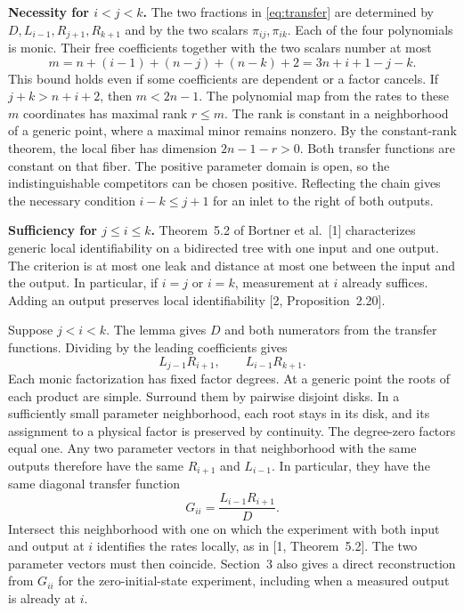 \documentclass[11pt,a4paper]{article}
\begin{document}
\noindent\textbf{Necessity for \(i<j<k\).}
The two fractions in \eqref{eq:transfer} are determined by \(D,L_{i-1},R_{j+1},R_{k+1}\) and by the two scalars \(\pi_{ij},\pi_{ik}\). Each of the four polynomials is monic. Their free coefficients together with the two scalars number at most
\begin{equation}
 m=n+(i-1)+(n-j)+(n-k)+2=3n+i+1-j-k. \label{eq:count}
\end{equation}
This bound holds even if some coefficients are dependent or a factor cancels. If \(j+k>n+i+2\), then \(m<2n-1\). The polynomial map from the rates to these \(m\) coordinates has maximal rank \(r\le m\). The rank is constant in a neighborhood of a generic point, where a maximal minor remains nonzero. By the constant-rank theorem, the local fiber has dimension \(2n-1-r>0\). Both transfer functions are constant on that fiber. The positive parameter domain is open, so the indistinguishable competitors can be chosen positive. Reflecting the chain gives the necessary condition \(i-k\le j+1\) for an inlet to the right of both outputs.

\noindent\textbf{Sufficiency for \(j\le i\le k\).}
Theorem~5.2 of Bortner et al.~[1] characterizes generic local identifiability on a bidirected tree with one input and one output. The criterion is at most one leak and distance at most one between the input and the output. In particular, if \(i=j\) or \(i=k\), measurement at \(i\) already suffices. Adding an output preserves local identifiability [2, Proposition~2.20].

Suppose \(j<i<k\). The lemma gives \(D\) and both numerators from the transfer functions. Dividing by the leading coefficients gives
\[
             L_{j-1}R_{i+1},\qquad L_{i-1}R_{k+1}.
\]
Each monic factorization has fixed factor degrees. At a generic point the roots of each product are simple. Surround them by pairwise disjoint disks. In a sufficiently small parameter neighborhood, each root stays in its disk, and its assignment to a physical factor is preserved by continuity. The degree-zero factors equal one. Any two parameter vectors in that neighborhood with the same outputs therefore have the same \(R_{i+1}\) and \(L_{i-1}\). In particular, they have the same diagonal transfer function
\[
                   G_{ii}=\frac{L_{i-1}R_{i+1}}{D}.
\]
Intersect this neighborhood with one on which the experiment with both input and output at \(i\) identifies the rates locally, as in [1, Theorem~5.2]. The two parameter vectors must then coincide. Section~3 also gives a direct reconstruction from \(G_{ii}\) for the zero-initial-state experiment, including when a measured output is already at \(i\).
\end{document}
